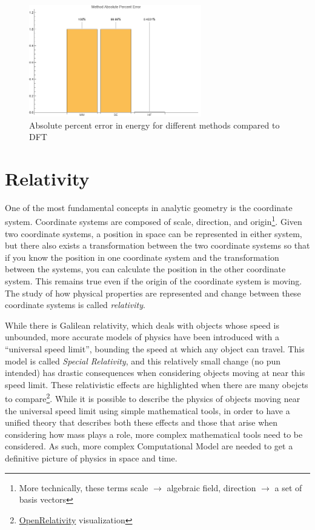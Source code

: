 \documentclass{report}
\begin{document}
            \begin{figure}[h]
                \centering
                \includegraphics[width=0.67\textwidth]{images/Method_APE.png}
                \caption{Absolute percent error in energy for different methods compared to DFT}
                \label{fig:Method_APE}
            \end{figure}
\clearpage
\newpage

\chapter{Relativity} \label{sec:relativity}

    One of the most fundamental concepts in analytic geometry is the coordinate system.  Coordinate systems are composed of scale, direction, and origin\footnote{More technically, these terms scale $\rightarrow$ algebraic field, direction $\rightarrow$ a set of basis vectors}.  Given two coordinate systems, a position in space can be represented in either system, but there also exists a transformation between the two coordinate systems so that if you know the position in one coordinate system and the transformation between the systems, you can calculate the position in the other coordinate system.  This remains true even if the origin of the coordinate system is moving.  The study of how physical properties are represented and change between these coordinate systems is called \emph{relativity}.  
    
    While there is Galilean relativity, which deals with objects whose speed is unbounded, more accurate models of physics have been introduced\cite{einstein1905electrodynamics} with a ``universal speed limit'', bounding the speed at which any object can travel.  This model is called \emph{Special Relativity}, and this relatively small change (no pun intended) has drastic consequences when considering objects moving at near this speed limit.  These relativistic effects are highlighted when there are many obejcts to compare\footnote{\href{https://youtu.be/qol-zP9W5J4?si=7ty4vfO9ceFox48e}{OpenRelativity} visualization}\cite{openrelativity}.  While it is possible to describe the physics of objects moving near the universal speed limit using simple mathematical tools, in order to have a unified theory that describes both these effects and those that arise when considering how mass plays a role, more complex mathematical tools need to be considered.  As such, more complex Computational Model are needed to get a definitive picture of physics in space and time.
\end{document}
